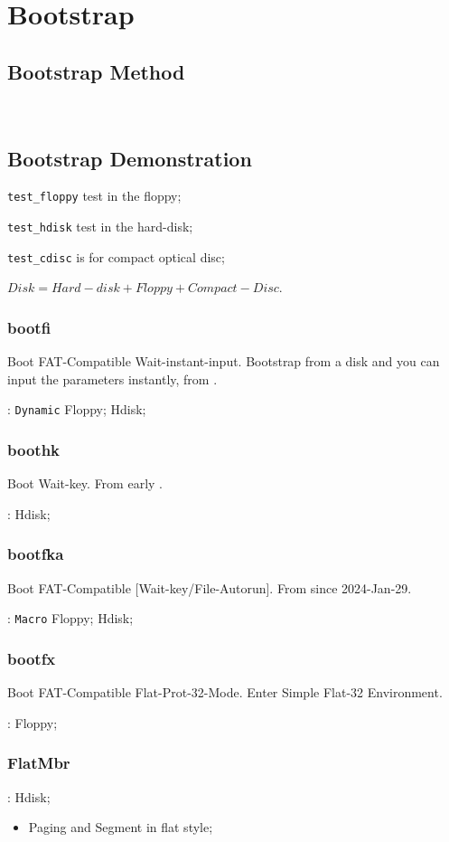 
\section{Bootstrap}

\subsection{Bootstrap Method}\label{BootstrapMethod} \

\subsection{Bootstrap Demonstration}

\verb`test_floppy` test in the floppy;

\verb`test_hdisk` test in the hard-disk;

\verb`test_cdisc` is  for compact optical disc;

$Disk = Hard-disk + Floppy + Compact-Disc$.

\subsubsection{bootfi}

Boot FAT-Compatible Wait-instant-input. Bootstrap from a disk and you can input the parameters instantly, from .

: \verb|Dynamic| Floppy; Hdisk;

\subsubsection{boothk}

Boot Wait-key. From early .

: Hdisk;

\subsubsection{bootfka}

Boot FAT-Compatible [Wait-key/File-Autorun]. From  since 2024-Jan-29.

: \verb`Macro` Floppy; Hdisk;

\subsubsection{bootfx}

Boot FAT-Compatible Flat-Prot-32-Mode. Enter Simple Flat-32 Environment.

: Floppy;

\subsubsection{FlatMbr}


: Hdisk;

\begin{itemize}
	\item Paging and Segment in flat style;
\end{itemize}
